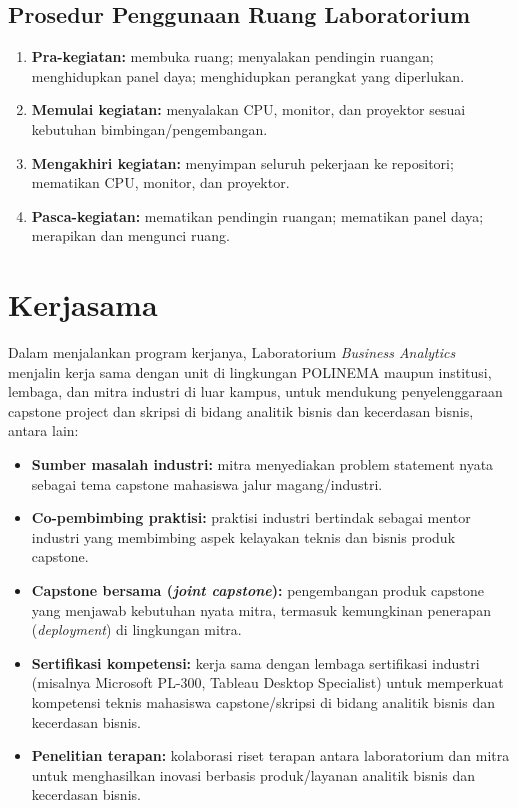\documentclass[12pt,a4paper]{report}
\begin{document}
\section{Prosedur Penggunaan Ruang Laboratorium}
\begin{enumerate}
\item \textbf{Pra-kegiatan:} membuka ruang; menyalakan pendingin ruangan; menghidupkan panel daya; menghidupkan perangkat yang diperlukan.
\item \textbf{Memulai kegiatan:} menyalakan CPU, monitor, dan proyektor sesuai kebutuhan bimbingan/pengembangan.
\item \textbf{Mengakhiri kegiatan:} menyimpan seluruh pekerjaan ke repositori; mematikan CPU, monitor, dan proyektor.
\item \textbf{Pasca-kegiatan:} mematikan pendingin ruangan; mematikan panel daya; merapikan dan mengunci ruang.
\end{enumerate}

\chapter{Kerjasama}

Dalam menjalankan program kerjanya, Laboratorium \emph{Business Analytics} menjalin kerja sama dengan unit di lingkungan POLINEMA maupun institusi, lembaga, dan mitra industri di luar kampus, untuk mendukung penyelenggaraan capstone project dan skripsi di bidang analitik bisnis dan kecerdasan bisnis, antara lain:
\begin{itemize}
\item \textbf{Sumber masalah industri:} mitra menyediakan problem statement nyata sebagai tema capstone mahasiswa jalur magang/industri.
\item \textbf{Co-pembimbing praktisi:} praktisi industri bertindak sebagai mentor industri yang membimbing aspek kelayakan teknis dan bisnis produk capstone.
\item \textbf{Capstone bersama (\emph{joint capstone}):} pengembangan produk capstone yang menjawab kebutuhan nyata mitra, termasuk kemungkinan penerapan (\emph{deployment}) di lingkungan mitra.
\item \textbf{Sertifikasi kompetensi:} kerja sama dengan lembaga sertifikasi industri (misalnya Microsoft PL-300, Tableau Desktop Specialist) untuk memperkuat kompetensi teknis mahasiswa capstone/skripsi di bidang analitik bisnis dan kecerdasan bisnis.
\item \textbf{Penelitian terapan:} kolaborasi riset terapan antara laboratorium dan mitra untuk menghasilkan inovasi berbasis produk/layanan analitik bisnis dan kecerdasan bisnis.
\end{itemize}

\PedomanPengesahan
\end{document}

